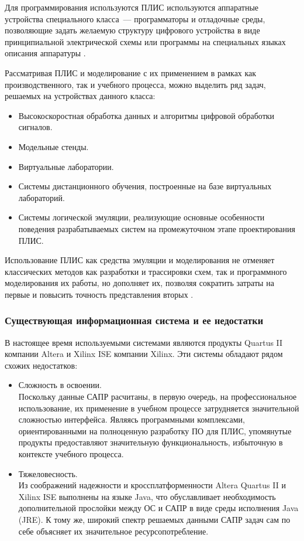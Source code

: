 Для программирования используются ПЛИС используются аппаратные устройства специального класса~--- программаторы и отладочные среды, позволяющие задать желаемую структуру цифрового устройства в виде принципиальной электрической схемы или программы на специальных языках описания аппаратуры \cite[c.~18]{popov}.

Рассматривая ПЛИС и моделирование с их применением в рамках как производственного, так и учебного процесса, можно выделить ряд задач, решаемых на устройствах данного класса:
\begin{itemize}
  \item Высокоскоростная обработка данных и алгоритмы цифровой обработки сигналов.
  \item Модельные стенды.
  \item Виртуальные лаборатории.
  \item Системы дистанционного обучения, построенные на базе виртуальных лабораторий.
  \item Системы логической эмуляции, реализующие основные особенности поведения разрабатываемых систем на промежуточном этапе проектирования ПЛИС.
\end{itemize}

Использование ПЛИС как средства эмуляции и моделирования не отменяет классических методов как разработки и трассировки схем, так и программного моделирования их работы, но дополняет их, позволяя сократить затраты на первые и повысить точность представления вторых \cite[c.~411]{ugryumov}.


\subsubsection{Существующая информационная система и ее недостатки} \label{sec:characteristics:analysis}
В настоящее время используемыми системами являются продукты Quartus II компании Altera и Xilinx ISE компании Xilinx.
Эти системы обладают рядом схожих недостатков:
\begin{itemize}
  \item Сложность в освоении.\\
  Поскольку данные САПР расчитаны, в первую очередь, на профессиональное использование, их применение в учебном процессе затрудняется значительной сложностью интерфейса.
  Являясь программными комплексами, ориентированными на полноценную разработку ПО для ПЛИС, упомянутые продукты предоставляют значительную функциональность, избыточную в контексте учебного процесса.
  \item Тяжеловесность.\\
  Из соображений надежности и кроссплатформенности Altera Quartus II и Xilinx ISE выполнены на языке Java, что обуславливает необходимость дополнительной прослойки между ОС и САПР в виде среды исполнения Java (JRE).
  К тому же, широкий спектр решаемых данными САПР задач сам по себе объясняет их значительное ресурсопотребление.
\end{itemize}


